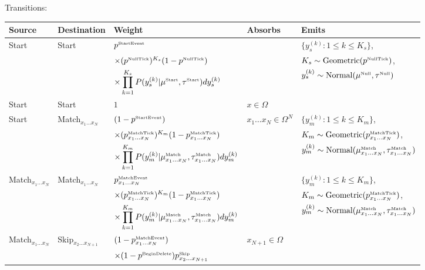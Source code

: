\documentclass[10pt]{article}
\begin{document}
\noindent Transitions:
\\
\noindent
\begin{tabular}{lllll}
\hline
Source & Destination & Weight & Absorbs & Emits \\
\hline
Start & Start & $p^{\mbox{\tiny StartEvent}}$ & & $\{ y_s^{(k)}: 1 \leq k \leq K_s \}$, \\
& & $\times (p^{\mbox{\tiny NullTick}})^{K_s} (1-p^{\mbox{\tiny NullTick}})$ & & $K_s \sim \mbox{Geometric}(p^{\mbox{\tiny NullTick}})$, \\
& & $\times \displaystyle \prod_{k=1}^{K_s} P(y^{(k)}_s|\mu^{\mbox{\tiny Start}},\tau^{\mbox{\tiny Start}}) dy^{(k)}_s$ & & $y_s^{(k)} \sim \mbox{Normal}(\mu^{\mbox{\tiny Null}},\tau^{\mbox{\tiny Null}})$ \\
Start & Start & $1$ & $x \in \Omega$ & \\
Start & Match${}_{x_1 \ldots x_N}$ & $(1 - p^{\mbox{\tiny StartEvent}})$ & $x_1 \ldots x_N \in \Omega^N$ & $\{ y_m^{(k)}: 1 \leq k \leq K_m \}$, \\
& & $\times (p^{\mbox{\tiny MatchTick}}_{x_1\ldots x_N})^{K_m} (1-p^{\mbox{\tiny MatchTick}}_{x_1\ldots x_N})$ & & $K_m \sim \mbox{Geometric}(p^{\mbox{\tiny MatchTick}}_{x_1\ldots x_N})$, \\
& & $\times \displaystyle \prod_{k=1}^{K_m} P(y^{(k)}_m|\mu^{\mbox{\tiny Match}}_{x_1\ldots x_N},\tau^{\mbox{\tiny Match}}_{x_1\ldots x_N}) dy^{(k)}_m$ & & $y_m^{(k)} \sim \mbox{Normal}(\mu^{\mbox{\tiny Match}}_{x_1\ldots x_N},\tau^{\mbox{\tiny Match}}_{x_1\ldots x_N})$ \\
Match${}_{x_1 \ldots x_N}$ & Match${}_{x_1 \ldots x_N}$ & ${p^{\mbox{\tiny MatchEvent}}_{x_1\ldots x_N}}$ & & $\{ y_m^{(k)}: 1 \leq k \leq K_m \}$, \\
& & $\times (p^{\mbox{\tiny MatchTick}}_{x_1\ldots x_N})^{K_m} (1-p^{\mbox{\tiny MatchTick}}_{x_1\ldots x_N} )$ & & $K_m \sim \mbox{Geometric}(p^{\mbox{\tiny MatchTick}}_{x_1\ldots x_N})$, \\
& & $\times \displaystyle \prod_{k=1}^{K_m} P(y^{(k)}_m|\mu^{\mbox{\tiny Match}}_{x_1\ldots x_N},\tau^{\mbox{\tiny Match}}_{x_1\ldots x_N}) dy^{(k)}_m$ & & $y_m^{(k)} \sim \mbox{Normal}(\mu^{\mbox{\tiny Match}}_{x_1\ldots x_N},\tau^{\mbox{\tiny Match}}_{x_1\ldots x_N})$ \\
Match${}_{x_1 \ldots x_N}$ & Skip${}_{x_2 \ldots x_{N+1}}$ & $(1 - {p^{\mbox{\tiny MatchEvent}}_{x_1\ldots x_N}})$ & $x_{N+1} \in \Omega$ & \\
& & $\times (1 - p^{\mbox{\tiny BeginDelete}}) p^{\mbox{\tiny Skip}}_{x_2\ldots x_{N+1}}$ & & \\

\end{tabular}
\end{document}
